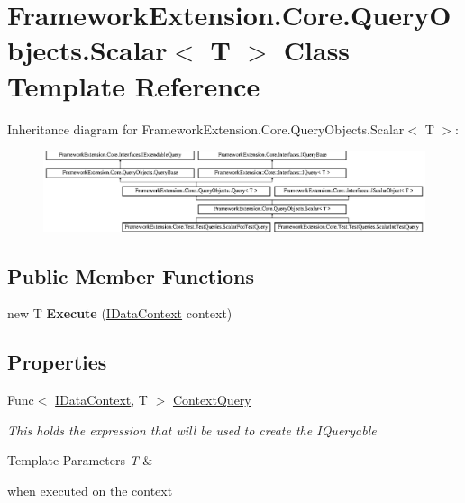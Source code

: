\hypertarget{class_framework_extension_1_1_core_1_1_query_objects_1_1_scalar-g}{\section{Framework\-Extension.\-Core.\-Query\-Objects.\-Scalar$<$ T $>$ Class Template Reference}
\label{class_framework_extension_1_1_core_1_1_query_objects_1_1_scalar-g}
}
Inheritance diagram for Framework\-Extension.\-Core.\-Query\-Objects.\-Scalar$<$ T $>$\-:\begin{figure}[H]
\begin{center}
\leavevmode
\includegraphics[height=2.393162cm]{class_framework_extension_1_1_core_1_1_query_objects_1_1_scalar-g}
\end{center}
\end{figure}
\subsection*{Public Member Functions}
\begin{DoxyCompactItemize}
\item 
\hypertarget{class_framework_extension_1_1_core_1_1_query_objects_1_1_scalar-g_ada3c86db2397c4c54e9fffed8ebe5891}{new T {\bfseries Execute} (\hyperlink{interface_framework_extension_1_1_core_1_1_interfaces_1_1_i_data_context}{I\-Data\-Context} context)}\label{class_framework_extension_1_1_core_1_1_query_objects_1_1_scalar-g_ada3c86db2397c4c54e9fffed8ebe5891}

\end{DoxyCompactItemize}
\subsection*{Properties}
\begin{DoxyCompactItemize}
\item 
Func$<$ \hyperlink{interface_framework_extension_1_1_core_1_1_interfaces_1_1_i_data_context}{I\-Data\-Context}, T $>$ \hyperlink{class_framework_extension_1_1_core_1_1_query_objects_1_1_scalar-g_ad6de4637a09a695d7934b52f5008369b}{Context\-Query}
\begin{DoxyCompactList}\small\item\em This holds the expression that will be used to create the I\-Queryable
\begin{DoxyTemplParams}{Template Parameters}
{\em T} & \\
\hline
\end{DoxyTemplParams}
when executed on the context \end{DoxyCompactList}\end{DoxyCompactItemize}
